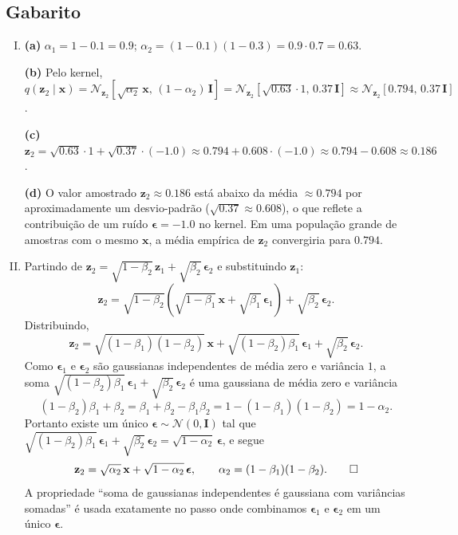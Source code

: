 \documentclass{dlproblemset}
\begin{document}
\subsection*{Gabarito}
\color{blue}
\begin{enumerate}[I)]
    \item \textbf{(a)} $\alpha_1 = 1 - 0.1 = 0.9$; $\alpha_2 = (1 - 0.1)(1 - 0.3) = 0.9 \cdot 0.7 = 0.63$.

    \textbf{(b)} Pelo kernel, $q(\mathbf{z}_2 \mid \mathbf{x}) = \mathcal{N}_{\mathbf{z}_2}[\sqrt{\alpha_2}\, \mathbf{x},\, (1 - \alpha_2)\,\mathbf{I}] = \mathcal{N}_{\mathbf{z}_2}[\sqrt{0.63}\cdot 1,\, 0.37\,\mathbf{I}] \approx \mathcal{N}_{\mathbf{z}_2}[0.794,\, 0.37\,\mathbf{I}]$.

    \textbf{(c)} $\mathbf{z}_2 = \sqrt{0.63}\cdot 1 + \sqrt{0.37}\cdot (-1.0) \approx 0.794 + 0.608\cdot (-1.0) \approx 0.794 - 0.608 \approx 0.186$.

    \textbf{(d)} O valor amostrado $\mathbf{z}_2 \approx 0.186$ está abaixo da média $\approx 0.794$ por aproximadamente um desvio-padrão ($\sqrt{0.37} \approx 0.608$), o que reflete a contribuição de um ruído $\boldsymbol{\epsilon} = -1.0$ no kernel. Em uma população grande de amostras com o mesmo $\mathbf{x}$, a média empírica de $\mathbf{z}_2$ convergiria para $0.794$.

    \item Partindo de $\mathbf{z}_2 = \sqrt{1 - \beta_2}\,\mathbf{z}_1 + \sqrt{\beta_2}\,\boldsymbol{\epsilon}_2$ e substituindo $\mathbf{z}_1$:
    \[
      \mathbf{z}_2 = \sqrt{1 - \beta_2}\!\left(\sqrt{1 - \beta_1}\,\mathbf{x} + \sqrt{\beta_1}\,\boldsymbol{\epsilon}_1\right) + \sqrt{\beta_2}\,\boldsymbol{\epsilon}_2.
    \]
    Distribuindo,
    \[
      \mathbf{z}_2 = \sqrt{(1 - \beta_1)(1 - \beta_2)}\,\mathbf{x} + \sqrt{(1 - \beta_2)\beta_1}\,\boldsymbol{\epsilon}_1 + \sqrt{\beta_2}\,\boldsymbol{\epsilon}_2.
    \]
    Como $\boldsymbol{\epsilon}_1$ e $\boldsymbol{\epsilon}_2$ são gaussianas independentes de média zero e variância $1$, a soma $\sqrt{(1 - \beta_2)\beta_1}\,\boldsymbol{\epsilon}_1 + \sqrt{\beta_2}\,\boldsymbol{\epsilon}_2$ é uma gaussiana de média zero e variância
    \[
      (1 - \beta_2)\beta_1 + \beta_2 = \beta_1 + \beta_2 - \beta_1\beta_2 = 1 - (1 - \beta_1)(1 - \beta_2) = 1 - \alpha_2.
    \]
    Portanto existe um único $\boldsymbol{\epsilon} \sim \mathcal{N}(0,\mathbf{I})$ tal que $\sqrt{(1 - \beta_2)\beta_1}\,\boldsymbol{\epsilon}_1 + \sqrt{\beta_2}\,\boldsymbol{\epsilon}_2 = \sqrt{1 - \alpha_2}\,\boldsymbol{\epsilon}$, e segue
    \[
      \mathbf{z}_2 = \sqrt{\alpha_2}\,\mathbf{x} + \sqrt{1 - \alpha_2}\,\boldsymbol{\epsilon}, \qquad \alpha_2 = (1 - \beta_1)(1 - \beta_2). \qed
    \]
    A propriedade ``soma de gaussianas independentes é gaussiana com variâncias somadas'' é usada exatamente no passo onde combinamos $\boldsymbol{\epsilon}_1$ e $\boldsymbol{\epsilon}_2$ em um único $\boldsymbol{\epsilon}$.


\end{enumerate}
\end{document}
